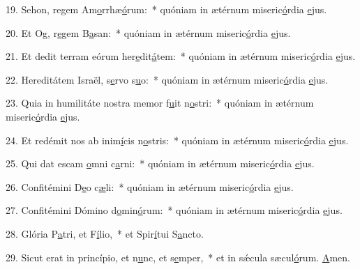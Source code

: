 19. Sehon, regem Am\uline{o}rrhæ\uline{ó}rum:~* quóniam in ætérnum miseric\uline{ó}rdia \uline{e}jus.\par 
20. Et Og, r\uline{e}gem B\uline{a}san:~* quóniam in ætérnum miseric\uline{ó}rdia \uline{e}jus.\par 
21. Et dedit terram eórum her\uline{e}dit\uline{á}tem:~* quóniam in ætérnum miseric\uline{ó}rdia \uline{e}jus.\par 
22. Hereditátem Israël, s\uline{e}rvo s\uline{u}o:~* quóniam in ætérnum miseric\uline{ó}rdia \uline{e}jus.\par 
23. Quia in humilitáte nostra memor f\uline{u}it n\uline{o}stri:~* quóniam in ætérnum miseric\uline{ó}rdia \uline{e}jus.\par 
24. Et redémit nos ab inim\uline{í}cis n\uline{o}stris:~* quóniam in ætérnum miseric\uline{ó}rdia \uline{e}jus.\par 
25. Qui dat escam \uline{o}mni c\uline{a}rni:~* quóniam in ætérnum miseric\uline{ó}rdia \uline{e}jus.\par 
26. Confitémini D\uline{e}o c\uline{æ}li:~* quóniam in ætérnum miseric\uline{ó}rdia \uline{e}jus.\par 
27. Confitémini Dómino d\uline{o}min\uline{ó}rum:~* quóniam in ætérnum miseric\uline{ó}rdia \uline{e}jus.\par 
28. Glória P\uline{a}tri, et F\uline{í}lio,~* et Spir\uline{í}tui S\uline{a}ncto.\par 
29. Sicut erat in princípio, et n\uline{u}nc, et s\uline{e}mper,~* et in sǽcula sæcul\uline{ó}rum. \uline{A}men.\par 
